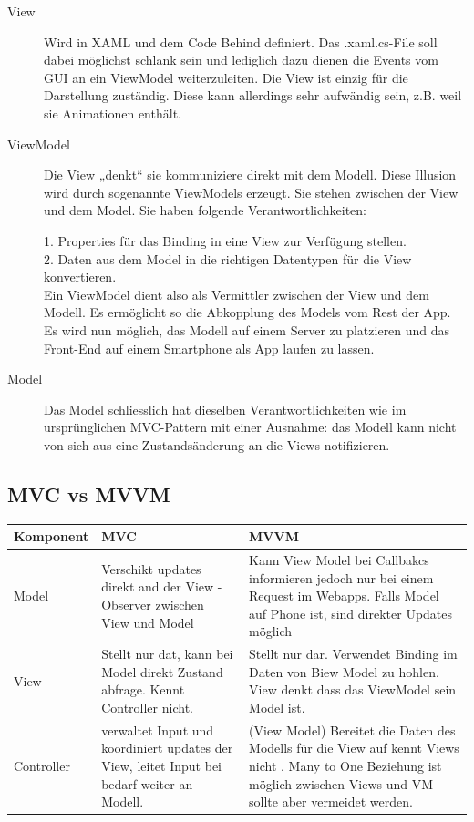 \documentclass[a4paper,10pt]{scrreprt}
\begin{document}
\begin{description}
\item[View ]Wird in XAML und dem Code Behind definiert. Das .xaml.cs-File soll dabei möglichst schlank sein
und lediglich dazu dienen die Events vom GUI an ein ViewModel weiterzuleiten. Die View ist
einzig für die Darstellung zuständig. Diese kann allerdings sehr aufwändig sein, z.B. weil sie
Animationen enthält.

\item[ViewModel] Die View „denkt“ sie kommuniziere direkt mit dem Modell. Diese Illusion wird durch
sogenannte ViewModels erzeugt. Sie stehen zwischen der View und dem Model. Sie haben
folgende Verantwortlichkeiten:

1. Properties für das Binding in eine View zur Verfügung stellen.\\
2. Daten aus dem Model in die richtigen Datentypen für die View konvertieren.\\
Ein ViewModel dient also als Vermittler zwischen der View und dem Modell. Es ermöglicht so
die Abkopplung des Models vom Rest der App. Es wird nun möglich, das Modell auf einem
Server zu platzieren und das Front-End auf einem Smartphone als App laufen zu lassen.

\item[Model] Das Model schliesslich hat dieselben Verantwortlichkeiten wie im ursprünglichen MVC-Pattern
mit einer Ausnahme: das Modell kann nicht von sich aus eine Zustandsänderung an die Views
notifizieren.

\end{description}

\subsection{MVC vs MVVM}

\begin{tabular}{|l | p{7cm} | p{7cm}|}
 \hline
\textbf{Komponent} & \textbf{MVC} & \textbf{MVVM} \\ \hline
Model &  Verschikt updates direkt and der View - Observer zwischen View und 
Model & Kann View Model bei Callbakcs informieren jedoch nur bei einem Request im Webapps. Falls Model auf Phone ist,
sind direkter Updates möglich \\ \hline
View & Stellt nur dat, kann bei Model direkt Zustand abfrage. Kennt Controller nicht. & Stellt nur dar. Verwendet Binding im Daten von Biew Model zu 
hohlen. View denkt dass das ViewModel sein Model ist.\\ \hline
Controller & verwaltet Input und koordiniert updates der View, leitet Input bei bedarf weiter an Modell. & (View Model) Bereitet die Daten des 
Modells für die View auf kennt Views nicht . Many to One Beziehung ist möglich zwischen Views und VM sollte aber vermeidet werden. \\ \hline

\end{tabular}
\end{document}
